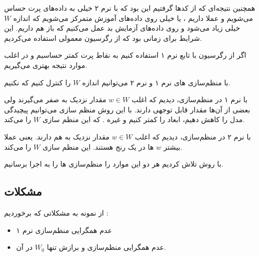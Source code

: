 \documentclass[a4paper, 12pt]{article}
\begin{document}
همچنین نتیجه‌ای که از کد‌ها گرفتیم این بود که با نرم ۲ خیلی به داده‌های پرت حساس می‌شویم و عملا 
داریم ، یا خیلی روی داده‌های آموزش متمرکز می‌شویم که اندازه 
$W$
خیلی زیاد می‌شود و روی داده‌های آزمایش بد عمل می‌کنیم که باز هم 
داریم. این شرایط برای زمانی بود که از رگرسیون معمولی استفاده می‌کردیم. 


اگر از رگرسیون با تابع 
نرم ۱ استفاده کنیم به نقاط پرت کمتر حساسیم و در اغلب موارد نتیجه بهتری می‌گیریم. 

با منظم‌سازی های نرم ۱ و نرم ۲ می‌توانیم اندازه 
$W$
را کنترل کنیم که 
نکنیم. 

با نرم ۱ در منظم‌سازی، دیدیم که اغلب 
$w \in W $
مقدار نزدیک به صفر می‌گیرند ولی بعضی از آن‌ها مقدار قابل توجهی دارند. با این روش منظم سازی می‌توانیم پیچیدگی مدل را کاهش دهیم، ابعاد را کمتر کنیم و غیره . که این منظم سازی 
$W$
را 
می‌کند.


با نرم ۲ در منظم‌سازی، دیدیم که اغلب 
$w \in W$
مقدار نزدیک به هم دارند. یعنی عملا بیشتر 
$w$
ها در یک رنج هستند. این منظم سازی 
$W$
را 
می‌کند.


با روش 
تلاش کردیم هر دو این موارد را  منظم‌سازی ها را به اجرا برسانیم.



\subsection*{مشکلات}

از نمونه به مشکلاتی که برخوردیم  :


\begin{itemize}
	\item 
	عدم همگرایی منظم‌سازی نرم ۱ 
	\item
	عدم همگرایی منظم‌سازی 
	و برازش تنها 
	$W_0$
	در آن.
\end{itemize}
\end{document}

